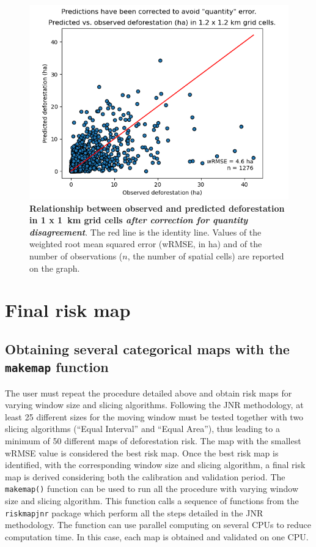 \documentclass[paper=a4, 12pt, DIV=12]{scrartcl}
\begin{document}
\begin{figure}[H]
\centering
\includegraphics[width=0.8\linewidth]{outputs/pred_obs_corrected_steps.png}
\caption{\label{fig:orgecc928e}\textbf{Relationship between observed and predicted deforestation in 1 x 1 km grid cells \emph{after correction for quantity disagreement}}. The red line is the identity line. Values of the weighted root mean squared error (wRMSE, in ha) and of the number of observations (\(n\), the number of spatial cells) are reported on the graph.}
\end{figure}

\section{Final risk map}
\label{sec:orgc96da30}

\subsection{Obtaining several categorical maps with the \texttt{makemap} function}
\label{sec:org9f80710}

The user must repeat the procedure detailed above and obtain risk maps for varying window size and slicing algorithms. Following the JNR methodology, at least 25 different sizes for the moving window must be tested together with two slicing algorithms (``Equal Interval'' and ``Equal Area''), thus leading to a minimum of 50 different maps of deforestation risk. The map with the smallest wRMSE value is considered the best risk map. Once the best risk map is identified, with the corresponding window size and slicing algorithm, a final risk map is derived considering both the calibration and validation period. The \texttt{makemap()} function can be used to run all the procedure with varying window size and slicing algorithm. This function calls a sequence of functions from the \texttt{riskmapjnr} package which perform all the steps detailed in the JNR methodology. The function can use parallel computing on several CPUs to reduce computation time. In this case, each map is obtained and validated on one CPU. 
\end{document}
